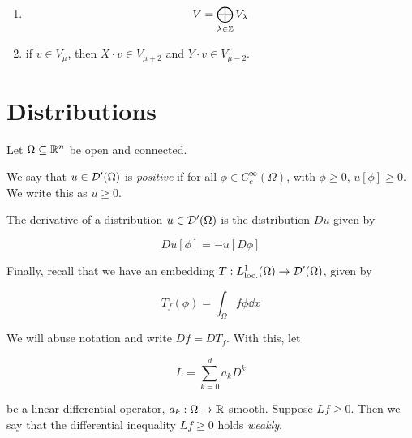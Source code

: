\documentclass{report}
\begin{document}
\begin{enumerate}
    \item \[V = \bigoplus_{\lambda \in \mathbb{Z}}V_\lambda\]
    \item if \(v \in V_\mu\), then \(X \cdot v \in V_{\mu+2}\) and \(Y \cdot v \in V_{\mu-2}\).
\end{enumerate}

\section{Distributions}

\label{sec:distributions}

Let \(\Omega \subseteq \mathbb{R}^n\) be open and connected.

\begin{definition}
    [positive]
    We say that \(u \in \mathcal{D}'(\Omega)\) is \emph{positive} if for all \(\phi \in C_c^\infty(\Omega)\), with \(\phi \ge 0\), \(u[\phi] \ge 0\). We write this as \(u \ge 0\). 
\end{definition}

\begin{definition}
    [derivative]

    The derivative of a distribution \(u \in \mathcal{D}'(\Omega)\) is the distribution \(Du\) given by

    \[Du[\phi] = -u[D\phi]\]
\end{definition}

Finally, recall that we have an embedding \(T : L^1_\text{loc.}(\Omega) \to \mathcal{D}'(\Omega)\), given by

\[T_f(\phi) = \int_\Omega f\phi \dd x\]

We will abuse notation and write \(Df = DT_f\). With this, let

\[L = \sum_{k=0}^d a_k D^k\]

be a linear differential operator, \(a_k : \Omega \to \mathbb{R}\) smooth. Suppose \(Lf \ge 0\). Then we say that the differential inequality \(Lf \ge 0\) holds \emph{weakly}.

\printbibliography
\end{document}
